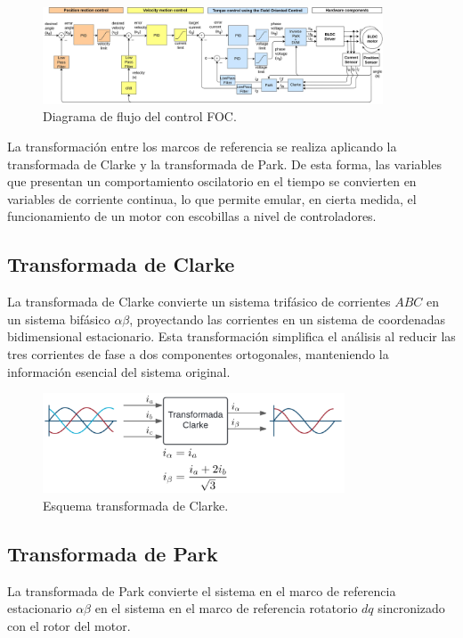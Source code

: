 \documentclass[11pt]{report}
\begin{document}
\begin{figure}[ht]
	\centering
	\includegraphics[width=0.9\textwidth]{imagenes/simpleFOC.jpg}
	\caption{Diagrama de flujo del control FOC.\cite{Skuric_SimpleFOC_A_Field_2022}}
	\label{fig:foc_transform}
\end{figure}
\FloatBarrier

La transformación entre los marcos de referencia se realiza aplicando la transformada de Clarke y la transformada de Park. De esta forma, las variables que presentan un comportamiento oscilatorio en el tiempo se convierten en variables de corriente continua, lo que permite emular, en cierta medida, el funcionamiento de un motor con escobillas a nivel de controladores. \cite{power_conv_14}

\subsection{Transformada de Clarke}
La transformada de Clarke convierte un sistema trifásico de corrientes \(ABC\) en un sistema bifásico \(\alpha\beta\), proyectando las corrientes en un sistema de coordenadas bidimensional estacionario. Esta transformación simplifica el análisis al reducir las tres corrientes de fase a dos componentes ortogonales, manteniendo la información esencial del sistema original. \cite{AN1078}


\begin{figure}[ht]
	\centering
	\includegraphics[width=0.8\textwidth]{imagenes/clarke.png}
	\caption{Esquema transformada de Clarke.}
	\label{fig:clarke_transform}
\end{figure}
\FloatBarrier

\newpage
\subsection{Transformada de Park}
La transformada de Park convierte el sistema en el marco de referencia estacionario \(\alpha\beta\) en el sistema en el marco de referencia rotatorio \(dq\) sincronizado con el rotor del motor. \cite{AN1078}
\end{document}
